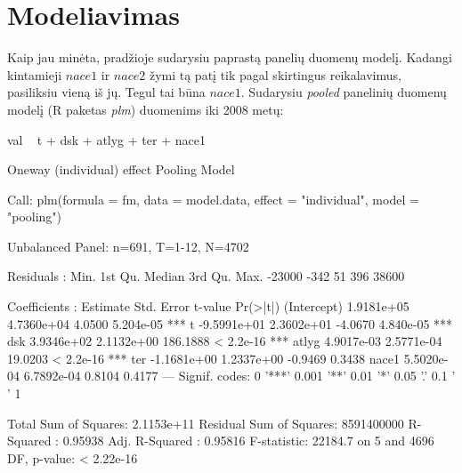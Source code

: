 \documentclass[a4paper]{article}
\newcommand{\R}{R}
\begin{document}
\section{Modeliavimas}

Kaip jau minėta, pradžioje sudarysiu paprastą panelių duomenų
modelį. Kadangi kintamieji $nace1$ ir $nace2$ žymi tą patį tik pagal
skirtingus reikalavimus, pasiliksiu vieną iš jų. Tegul tai būna
$nace1$. Sudarysiu \emph{pooled} panelinių duomenų modelį
(\R{} paketas \emph{plm}) duomenims iki 2008 metų:
\begin{Schunk}
\begin{Soutput}
val ~ t + dsk + atlyg + ter + nace1
\end{Soutput}
\end{Schunk}
\begin{Schunk}
\begin{Soutput}
Oneway (individual) effect Pooling Model

Call:
plm(formula = fm, data = model.data, effect = "individual", model = "pooling")

Unbalanced Panel: n=691, T=1-12, N=4702

Residuals :
   Min. 1st Qu.  Median 3rd Qu.    Max. 
 -23000    -342      51     396   38600 

Coefficients :
               Estimate  Std. Error  t-value  Pr(>|t|)    
(Intercept)  1.9181e+05  4.7360e+04   4.0500 5.204e-05 ***
t           -9.5991e+01  2.3602e+01  -4.0670 4.840e-05 ***
dsk          3.9346e+02  2.1132e+00 186.1888 < 2.2e-16 ***
atlyg        4.9017e-03  2.5771e-04  19.0203 < 2.2e-16 ***
ter         -1.1681e+00  1.2337e+00  -0.9469    0.3438    
nace1        5.5020e-04  6.7892e-04   0.8104    0.4177    
---
Signif. codes:  0 '***' 0.001 '**' 0.01 '*' 0.05 '.' 0.1 ' ' 1 

Total Sum of Squares:    2.1153e+11
Residual Sum of Squares: 8591400000
R-Squared      :  0.95938 
      Adj. R-Squared :  0.95816 
F-statistic: 22184.7 on 5 and 4696 DF, p-value: < 2.22e-16
\end{Soutput}
\end{Schunk}
\end{document}
